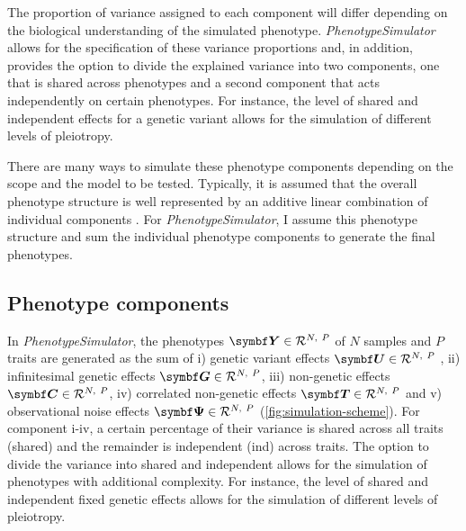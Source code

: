The proportion of variance assigned to each component will differ depending on the biological understanding of the simulated phenotype. \textit{PhenotypeSimulator} allows for the specification of these variance proportions and, in addition, provides the option to divide the explained variance into two components, one that is shared across phenotypes and a second component that acts independently on certain phenotypes. For instance, the level of shared and independent effects for a genetic variant allows for the simulation of different levels of pleiotropy.

There are many ways to simulate these phenotype components depending on the scope and the model to be tested. Typically, it is assumed that the overall phenotype structure is well represented by an additive linear combination of individual components \citep{Stephens2013,Marigorta2014,Zhou2014,Loh2014}. For \textit{PhenotypeSimulator}, I assume this phenotype structure and sum the individual phenotype components to generate the final phenotypes.

\subsection{Phenotype components}
 In \textit{PhenotypeSimulator}, the phenotypes \( \mat{Y} \inR N P\) of \(N\) samples and \(P\) traits are generated as the sum of i) genetic variant effects \( \mat{U}  \inR N P\) , ii) infinitesimal genetic effects \( \mat{G} \inR N P\), iii) non-genetic effects \( \mat{C} \inR N P\),  iv) correlated non-genetic effects \( \mat{T} \inR N P\) and  v) observational noise effects \( \mat{\Psi} \inR N P\) (\cref{fig:simulation-scheme}). For component i-iv, a certain percentage of their variance is shared across all traits (shared) and the remainder is independent (ind) across traits. The option to divide the variance into shared and independent allows for the simulation of phenotypes with additional complexity. For instance, the level of shared and independent fixed genetic effects allows for the simulation of different levels of pleiotropy.

